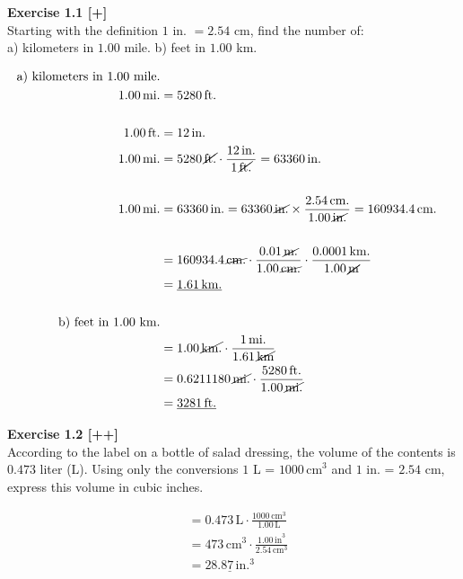 \begin{examplebox}
\textbf{Exercise 1.1 [+]}\\
Starting with the definition $1$ in. $= 2.54$ cm, find the number of: \\
a) kilometers in $1.00$ mile. \qquad b) feet in $1.00$ km.
\begin{mathbox}
\begin{align*}
\text{a) kilometers in 1.00 mile.}\\
1.00\, \text{mi.} &= 5280\, \text{ft.}\\\\
1.00\, \text{ft.} &= 12\, \text{in.}\\
1.00\, \text{mi.} &= 5280\, \cancel{\text{ft.}} \cdot \frac{12\, \text{in.}}{1\, \cancel{\text{ft.}}} = 63360\, \text{in.}\\\\
1.00\, \text{mi.} &= 63360\, \text{in.} = 63360\, \cancel{\text{in.}} \times \frac{2.54\, \text{cm.}}{1.00\, \cancel{\text{in.}}} = 160934.4\, \text{cm.}\\\\
&= 160934.4\, \cancel{\text{cm.}} \cdot \frac{0.01\, \cancel{\text{m.}}}{1.00\, \cancel{\text{cm.}}} \cdot \frac{0.0001\, \text{km.}}{1.00\, \cancel{\text{m}}}\\
&= \underline{1.61\, \text{km.}}\\\\
\text{b) feet in 1.00 km.}\\
&= 1.00\, \cancel{\text{km.}} \cdot \frac{1\, \text{mi.}}{1.61\, \cancel{\text{km}}}\\
&= 0.6211180\, \cancel{\text{mi.}} \cdot \frac{5280\, \text{ft.}}{1.00\, \cancel{\text{mi.}}}\\
&= \underline{3281\, \text{ft.}}
\end{align*}
\end{mathbox}
\end{examplebox} 

\begin{examplebox}
\textbf{Exercise 1.2 [++]}\\
According to the label on a bottle of salad dressing, the volume of the contents is $0.473$ liter (L). Using only the conversions $1$ L = ${1000\, \text{cm}}^3$ and $1$ in. = $2.54$ cm, express this volume in cubic inches.
\begin{mathbox}
\begin{align*}
&= 0.473\, \text{L} \cdot \frac{1000\, \text{cm}^3}{1.00\, \text{L}}\\
&= 473\, \text{cm}^3 \cdot \frac{1.00\, \text{in}^3}{2.54\, \text{cm}^3}\\
&= \underline{28.87\, \text{in.}^3}
\end{align*}
\end{mathbox}
\end{examplebox} 

